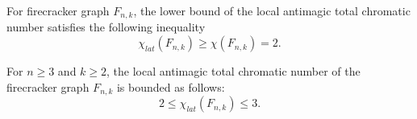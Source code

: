 \documentclass[10pt,a4paper]{amsart}
\begin{document}
\begin{theorem}\label{Theorem 2.3}
For firecracker graph $F_{n,k}$, the lower bound of the local antimagic total chromatic number satisfies the following inequality
\begin{equation*}
  \chi_{lat}(F_{n,k})\geq \chi(F_{n,k})=2.
\end{equation*}
\end{theorem}

\begin{theorem}
  For $n\geq 3$ and $k\geq 2$, the local antimagic total chromatic number of the firecracker graph $F_{n,k}$ is bounded as follows:
\begin{equation*}
  2\leq \chi_{lat}(F_{n,k})\leq 3.
\end{equation*}
\end{theorem}
\end{document}

